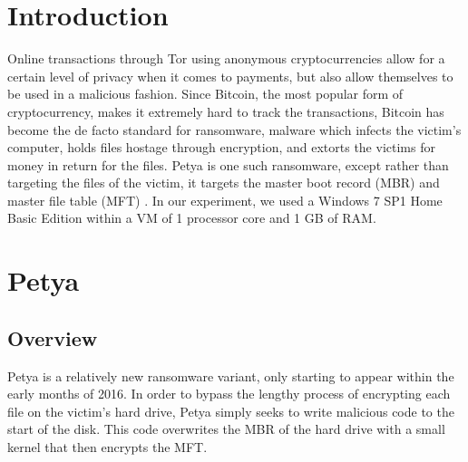\documentclass[twocolumn]{article}
\begin{document}

\section{Introduction}
\label{sec:introduction}
Online transactions through Tor \cite{tor} using anonymous cryptocurrencies allow for a certain level of privacy when it comes to payments, but also allow themselves to be used in a malicious fashion. Since Bitcoin, the most popular form of cryptocurrency, makes it extremely hard to track the transactions, Bitcoin has become the de facto standard for ransomware, malware which infects the victim's computer, holds files hostage through encryption, and extorts the victims for money in return for the files. Petya is one such ransomware, except rather than targeting the files of the victim, it targets the master boot record (MBR) and master file table (MFT) \cite{decryptPetya}. In our experiment, we used a Windows 7 SP1 Home Basic Edition within a VM of 1 processor core and 1 GB of RAM. 

\section{Petya}
\label{sec:petya}
\subsection{Overview}
Petya is a relatively new ransomware variant, only starting to appear within the early months of 2016. In order to bypass the lengthy process of encrypting each file on the victim's hard drive, Petya simply seeks to write malicious code to the start of the disk. This code overwrites the MBR of the hard drive with a small kernel that then encrypts the MFT. 
\end{document}
